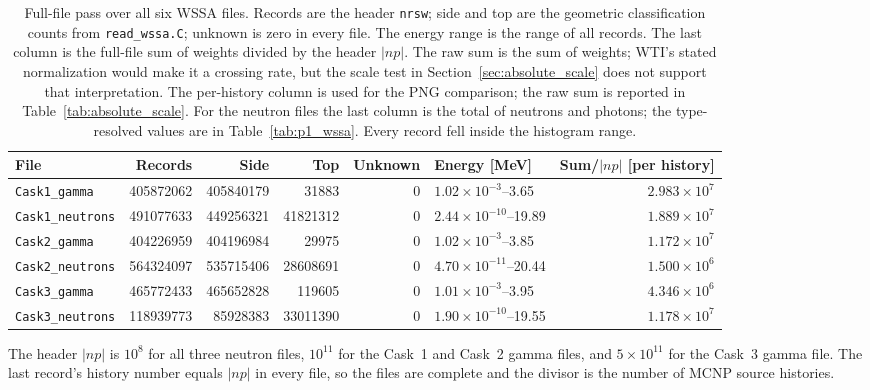 \documentclass[11pt,a4paper]{article}
\begin{document}
\begin{table}[t]
\centering
\caption{Full-file pass over all six WSSA files.  Records are the header
\texttt{nrsw}; side and top are the geometric classification counts from
\texttt{read\_wssa.C}; unknown is zero in every file.  The energy range is the
range of all records.  The last column is the full-file sum of weights divided
by the header $|np|$.  The raw sum is the sum of weights; WTI's stated
normalization would make it a crossing rate, but the scale test in
Section~\ref{sec:absolute_scale} does not support that interpretation.  The
per-history column is used for the PNG comparison; the raw sum is reported in
Table~\ref{tab:absolute_scale}.  For
the neutron files the last column is the total of neutrons and photons; the
type-resolved values are in Table~\ref{tab:p1_wssa}.  Every record fell inside
the histogram range.}
\label{tab:samples}
\footnotesize
\begin{tabular}{@{}l r r r r l r@{}}
\toprule
File & Records & Side & Top & Unknown & Energy [MeV] & Sum/$|np|$ [per history] \\
\midrule
\texttt{Cask1\_gamma}    & \num{405872062} & \num{405840179} & \num{31883}
  & 0 & $1.02\times10^{-3}$--3.65 & $2.983\times10^{7}$ \\
\texttt{Cask1\_neutrons} & \num{491077633} & \num{449256321} & \num{41821312}
  & 0 & $2.44\times10^{-10}$--19.89 & $1.889\times10^{7}$ \\
\texttt{Cask2\_gamma}    & \num{404226959} & \num{404196984} & \num{29975}
  & 0 & $1.02\times10^{-3}$--3.85 & $1.172\times10^{7}$ \\
\texttt{Cask2\_neutrons} & \num{564324097} & \num{535715406} & \num{28608691}
  & 0 & $4.70\times10^{-11}$--20.44 & $1.500\times10^{6}$ \\
\texttt{Cask3\_gamma}    & \num{465772433} & \num{465652828} & \num{119605}
  & 0 & $1.01\times10^{-3}$--3.95 & $4.346\times10^{6}$ \\
\texttt{Cask3\_neutrons} & \num{118939773} & \num{85928383} & \num{33011390}
  & 0 & $1.90\times10^{-10}$--19.55 & $1.178\times10^{7}$ \\
\bottomrule
\end{tabular}
\end{table}

The header $|np|$ is $10^{8}$ for all three neutron files, $10^{11}$ for the
Cask~1 and Cask~2 gamma files, and $5\times10^{11}$ for the Cask~3 gamma file.
The last record's history number equals $|np|$ in every file, so the files are
complete and the divisor is the number of MCNP source histories.
\end{document}
